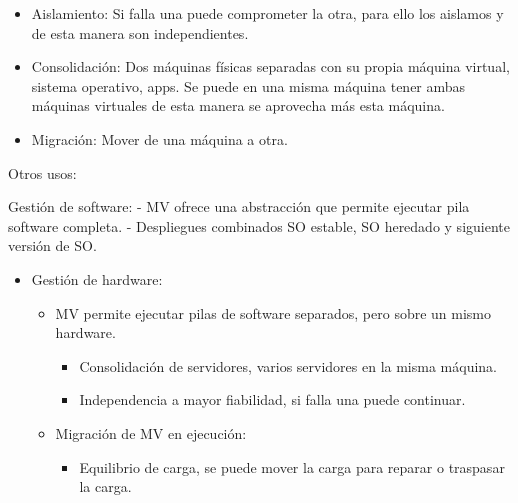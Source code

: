 \documentclass[12pt, twoside, openright]{report} %
\begin{document}
    \begin{itemize}
    \item
      Aislamiento: Si falla una puede comprometer la otra, para ello los
      aislamos y de esta manera son independientes.
      \begin{figure}[H]
        {\def\svgwidth{.7\textwidth}
         }
      \end{figure}
    \item
      Consolidación: Dos máquinas físicas separadas con su propia
      máquina virtual, sistema operativo, apps. Se puede en una misma
      máquina tener ambas máquinas virtuales de esta manera se aprovecha
      más esta máquina.
      \begin{figure}[H]
        {\def\svgwidth{.7\textwidth}
         }
      \end{figure}
    \item
      Migración: Mover de una máquina a otra.
      \begin{figure}[H]
        {\def\svgwidth{.7\textwidth}
         }
      \end{figure}
    \end{itemize}

    Otros usos:

    Gestión de software: - MV ofrece una abstracción que permite
    ejecutar pila software completa. - Despliegues combinados SO
    estable, SO heredado y siguiente versión de SO.

    \begin{itemize}
    
    \item
      Gestión de hardware:

      \begin{itemize}
      
      \item
        MV permite ejecutar pilas de software separados, pero sobre un
        mismo hardware.

        \begin{itemize}
        
        \item
          Consolidación de servidores, varios servidores en la misma
          máquina.
        \item
          Independencia a mayor fiabilidad, si falla una puede
          continuar.
        \end{itemize}
      \item
        Migración de MV en ejecución:

        \begin{itemize}
        
        \item
          Equilibrio de carga, se puede mover la carga para reparar o
          traspasar la carga.
        \end{itemize}
      \end{itemize}
    \end{itemize}
\end{document}
